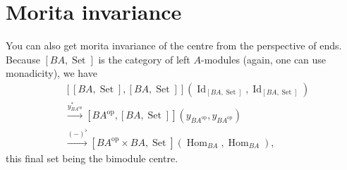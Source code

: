\documentclass{article}
\newcommand{\op}{{\tempop}}
\DeclareMathOperator{\Hom}{Hom}
\DeclareMathOperator{\Id}{Id}
\DeclareMathOperator{\Set}{Set}
\DeclareMathOperator{\tempop}{op}
\theoremstyle{definition}
\begin{document}
\section{Morita invariance}
You can also get morita invariance of the centre from the perspective of ends.
Because $[BA, \Set]$ is the category of left $A$-modules (again, one can use monadicity), we have
\begin{align*}
  &[[BA, \Set], [BA, \Set]](\Id_{[BA, \Set]}, \Id_{[BA, \Set]})\\
  &\xrightarrow{y_{BA^\op}^\ast} [BA^\op, [BA, \Set]](y_{BA^\op}, y_{BA^\op})\\
  &\xrightarrow{(-)^{\flat}} [BA^\op \times BA, \Set](\Hom_{BA}, \Hom_{BA}),
\end{align*}
this final set being the bimodule centre.



\end{document}
